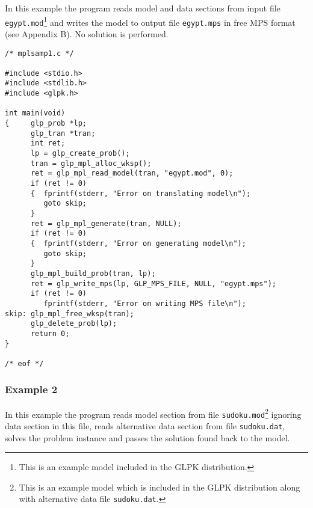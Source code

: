 \newpage


In this example the program reads model and data sections from input
file \verb|egypt.mod|\footnote{This is an example model included in
the GLPK distribution.} and writes the model to output file
\verb|egypt.mps| in free MPS format (see Appendix B). No solution is
performed.

\bigskip

\begin{small}
\begin{verbatim}
/* mplsamp1.c */

#include <stdio.h>
#include <stdlib.h>
#include <glpk.h>

int main(void)
{     glp_prob *lp;
      glp_tran *tran;
      int ret;
      lp = glp_create_prob();
      tran = glp_mpl_alloc_wksp();
      ret = glp_mpl_read_model(tran, "egypt.mod", 0);
      if (ret != 0)
      {  fprintf(stderr, "Error on translating model\n");
         goto skip;
      }
      ret = glp_mpl_generate(tran, NULL);
      if (ret != 0)
      {  fprintf(stderr, "Error on generating model\n");
         goto skip;
      }
      glp_mpl_build_prob(tran, lp);
      ret = glp_write_mps(lp, GLP_MPS_FILE, NULL, "egypt.mps");
      if (ret != 0)
         fprintf(stderr, "Error on writing MPS file\n");
skip: glp_mpl_free_wksp(tran);
      glp_delete_prob(lp);
      return 0;
}

/* eof */
\end{verbatim}
\end{small}

\newpage

\subsubsection*{Example 2}

In this example the program reads model section from file
\verb|sudoku.mod|\footnote{This is an example model which is included
in the GLPK distribution along with alternative data file
{\tt sudoku.dat}.} ignoring data section in this file, reads alternative
data section from file \verb|sudoku.dat|, solves the problem instance
and passes the solution found back to the model.

\bigskip


